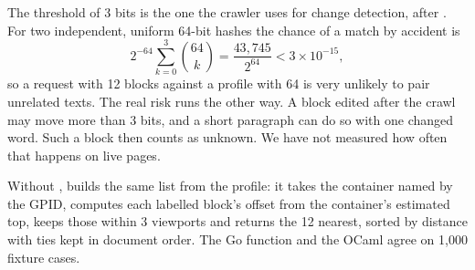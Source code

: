 The threshold of 3 bits is the one the crawler uses for change detection,
after \citet{manku2007detecting}. For two independent, uniform 64-bit hashes
the chance of a match by accident is
\begin{equation}\label{eq:slot-false}
2^{-64} \sum_{k=0}^{3} \binom{64}{k} = \frac{43{,}745}{2^{64}} < 3 \times 10^{-15},
\end{equation}
so a request with 12 blocks against a profile with 64 is very unlikely to
pair unrelated texts. The real risk runs the other way. A block edited after
the crawl may move more than 3 bits, and a short paragraph can do so with one
changed word. Such a block then counts as unknown. We have not measured how
often that happens on live pages.

Without ,  builds the same list from the
profile: it takes the container named by the GPID, computes each labelled
block's offset from the container's estimated top, keeps those within 3
viewports and returns the 12 nearest, sorted by distance with ties kept in
document order. The Go function and the OCaml  agree
on 1,000 fixture cases.
